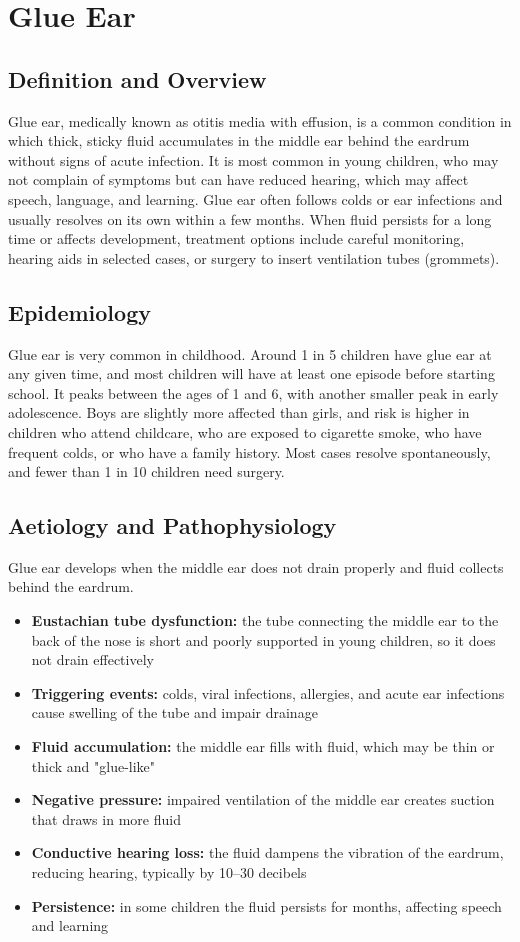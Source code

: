 \chapter{Glue Ear}

\section*{Definition and Overview}
Glue ear, medically known as otitis media with effusion, is a common condition in which thick, sticky fluid accumulates in the middle ear behind the eardrum without signs of acute infection. It is most common in young children, who may not complain of symptoms but can have reduced hearing, which may affect speech, language, and learning. Glue ear often follows colds or ear infections and usually resolves on its own within a few months. When fluid persists for a long time or affects development, treatment options include careful monitoring, hearing aids in selected cases, or surgery to insert ventilation tubes (grommets).

\section*{Epidemiology}
Glue ear is very common in childhood. Around 1 in 5 children have glue ear at any given time, and most children will have at least one episode before starting school. It peaks between the ages of 1 and 6, with another smaller peak in early adolescence. Boys are slightly more affected than girls, and risk is higher in children who attend childcare, who are exposed to cigarette smoke, who have frequent colds, or who have a family history. Most cases resolve spontaneously, and fewer than 1 in 10 children need surgery.

\section*{Aetiology and Pathophysiology}
Glue ear develops when the middle ear does not drain properly and fluid collects behind the eardrum.

\begin{itemize}
    \item \textbf{Eustachian tube dysfunction:} the tube connecting the middle ear to the back of the nose is short and poorly supported in young children, so it does not drain effectively
    \item \textbf{Triggering events:} colds, viral infections, allergies, and acute ear infections cause swelling of the tube and impair drainage
    \item \textbf{Fluid accumulation:} the middle ear fills with fluid, which may be thin or thick and "glue-like"
    \item \textbf{Negative pressure:} impaired ventilation of the middle ear creates suction that draws in more fluid
    \item \textbf{Conductive hearing loss:} the fluid dampens the vibration of the eardrum, reducing hearing, typically by 10--30 decibels
    \item \textbf{Persistence:} in some children the fluid persists for months, affecting speech and learning
\end{itemize}


